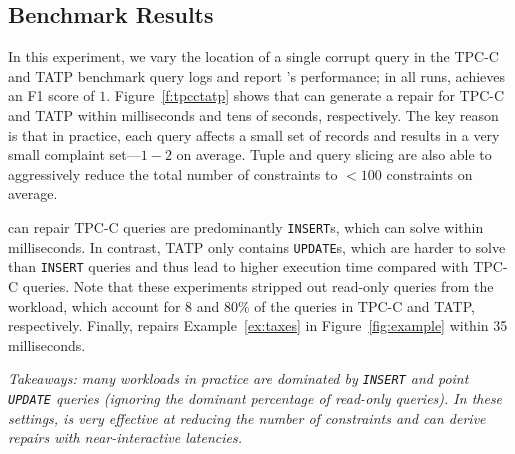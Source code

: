


\subsection{Benchmark Results}
\label{sec:experiments:benchmark}
In this experiment, we vary the location of a single corrupt query in the TPC-C and TATP benchmark query logs and report \sys's performance;
in all runs, \sys achieves an F1 score of $1$.
Figure~\ref{f:tpcctatp} shows that \sys can generate a repair for TPC-C and TATP within milliseconds and tens of seconds, respectively.
The key reason is that in practice, each query affects a small set of records and results in a very small complaint set---$1-2$ on average.
Tuple and query slicing are also able to aggressively reduce the total number of constraints to $<100$ constraints on average.

\sys can repair TPC-C  queries are predominantly \texttt{INSERT}s, which \sys can solve within milliseconds. 
In contrast, TATP only contains \texttt{UPDATE}s, which are harder to solve than \texttt{INSERT} queries and thus lead to higher execution time compared with TPC-C queries.
Note that these experiments stripped out read-only queries from the workload, which account for $8$ and $80\%$ of the queries in TPC-C and TATP, respectively.
Finally, \sys repairs Example~\ref{ex:taxes} in Figure~\ref{fig:example} within 35 milliseconds. 


{\it Takeaways: many workloads in practice are dominated by \texttt{INSERT} and point \texttt{UPDATE} queries (ignoring the dominant percentage of read-only queries).  
In these settings, \sys is very effective at reducing the number of constraints and can derive repairs with near-interactive latencies.}

